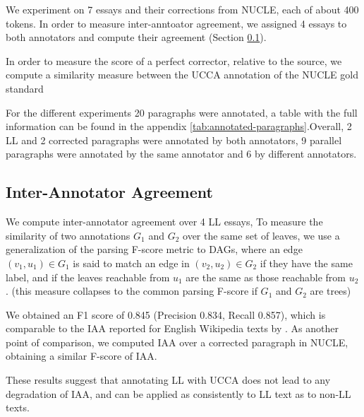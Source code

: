 \documentclass[letter,11pt]{article}
\begin{document}
We experiment on 7 essays and their corrections from NUCLE, each of about 400 tokens.
In order to measure inter-anntoator agreement, we assigned 4 essays to both annotators
and compute their agreement (Section \ref{sec:iaa}).

In order to measure the score
of a perfect corrector, relative to the source, we compute a similarity measure
between the UCCA annotation of the NUCLE gold standard 

For the different experiments 20 paragraphs were annotated, a table with the full
information can be found in the appendix \ref{tab:annotated-paragraphs}.Overall, 2 LL
and 2 corrected paragraphs were annotated by both annotators, 9 parallel paragraphs were
annotated by the same annotator and 6 by different annotators.

\subsection{Inter-Annotator Agreement}\label{sec:iaa}

We compute inter-annotator agreement over 4 LL essays, 
To measure the similarity of two annotations $G_1$ and $G_2$ over the same set of leaves,
we use a generalization of the parsing F-score metric to DAGs, where an
edge $(v_1,u_1) \in G_1$ is said to match an edge in $(v_2,u_2) \in G_2$ if
they have the same label, and if the leaves
reachable from $u_1$ are the same as those reachable from $u_2$. 
(this measure collapses to the common parsing F-score if $G_1$ and $G_2$ are trees)

We obtained an F1 score of 0.845 (Precision 0.834, Recall 0.857), which
is comparable to the IAA reported for English Wikipedia texts by \cite{abend2013universal}.
As another point of comparison, we computed IAA over a corrected paragraph in NUCLE,
obtaining a similar F-score of IAA.

These results suggest that annotating LL with UCCA does not lead to any degradation
of IAA, and can be applied as consistently to LL text as to non-LL texts.

\end{document}
